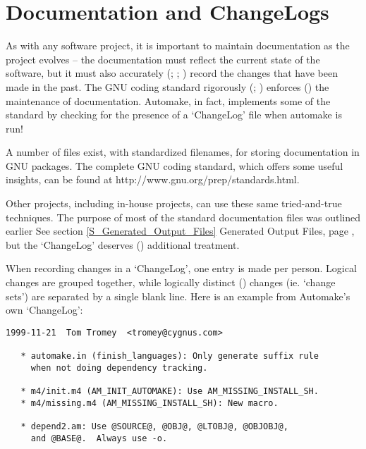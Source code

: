 \section{Documentation and ChangeLogs}\label{S_Documentation_and_ChangeLogs}


As with any software project, it is important to maintain documentation as the 
project evolves -- the documentation must reflect the current state of the 
software, but it must also accurately ({\MbQ{}}; {\McQ{}}; {\MbQ{}}) record the 
changes that have been made in the past. The GNU coding standard 
rigorously ({\MaQ{}}; {\MgQ{}}) enforces ({\MeQ{}}) the maintenance of documentation. Automake, in fact, implements some of the standard by checking for the presence of a `ChangeLog' file when automake is run! 


A number of files exist, with standardized filenames, for storing documentation in GNU packages. The complete GNU coding standard, which offers some useful insights, can be found at http://www.gnu.org/prep/standards.html. 


Other projects, including in-house projects, can use these same tried-and-true techniques. The purpose of most of the standard documentation files was outlined earlier See section \ref{S_Generated_Output_Files} Generated Output Files,
page \pageref{S_Generated_Output_Files}, but the `ChangeLog'
deserves ({\MbQ{}}) additional treatment. 


When recording changes in a `ChangeLog', one entry is made per person. Logical 
changes are grouped together, while logically distinct ({\MbQ{}}) changes
(ie. `change sets') are separated by a single blank line. Here is an example 
from Automake's own `ChangeLog': 


 
\begin{Verbatim}[frame=single]
1999-11-21  Tom Tromey  <tromey@cygnus.com>

   * automake.in (finish_languages): Only generate suffix rule
     when not doing dependency tracking.

   * m4/init.m4 (AM_INIT_AUTOMAKE): Use AM_MISSING_INSTALL_SH.
   * m4/missing.m4 (AM_MISSING_INSTALL_SH): New macro.

   * depend2.am: Use @SOURCE@, @OBJ@, @LTOBJ@, @OBJOBJ@,
     and @BASE@.  Always use -o.
\end{Verbatim}


